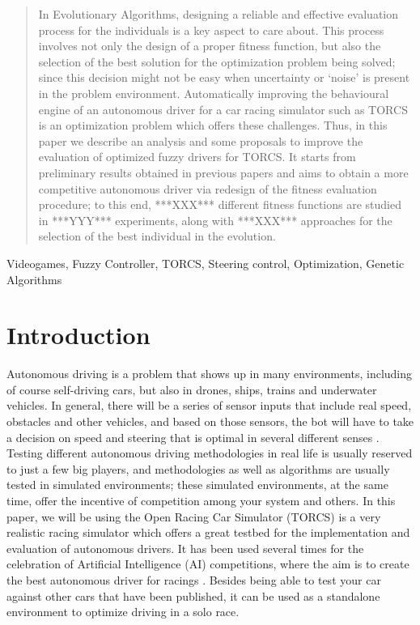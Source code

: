 \documentclass[conference]{IEEEtran}
\begin{document}
\begin{abstract}
	
In Evolutionary Algorithms, designing a reliable and effective
evaluation process for the individuals is a key aspect to care
about. This process involves not only the design of a proper fitness
function, but also the selection of the best solution for the
optimization problem being solved; since this decision might not be
easy when uncertainty or `noise' is present in the problem
environment. Automatically improving the behavioural engine of an
autonomous driver for a car racing simulator such as TORCS is an
optimization problem which offers these challenges. Thus, in this
paper we describe an analysis and some proposals to improve the
evaluation of optimized fuzzy drivers for TORCS. It starts from
preliminary results obtained in previous papers and aims to obtain a
more competitive autonomous driver via redesign of the fitness
evaluation procedure; to this end, ***XXX*** different fitness functions are
studied in ***YYY*** experiments, along with ***XXX***
approaches for the selection of the best individual in the evolution. 
\end{abstract}
\begin{IEEEkeywords}
Videogames, Fuzzy Controller, TORCS, Steering control, Optimization, Genetic Algorithms
\end{IEEEkeywords}
%
\section{Introduction}
\label{sec:intro}

Autonomous driving is a problem that shows up in many environments,
including of course self-driving cars, but also in drones, ships,
trains and underwater vehicles. In general, there will be a series of
sensor inputs that include real speed, obstacles and other vehicles,
and based on those sensors, the bot will have to take a decision on
speed and steering that is optimal in several different
senses \cite{Autodriv2006}. Testing different autonomous driving methodologies in real life is usually reserved to just a few big players, and methodologies
as well as algorithms are usually tested in simulated environments;
these simulated environments, at the same time, offer the incentive of
competition among your system and others. In this paper, we will be
using the Open Racing Car Simulator (TORCS) \cite{WebTORCS} is a very
realistic racing simulator which offers a great testbed for the
implementation and evaluation of autonomous drivers.  
It has been used several times for the celebration of Artificial
Intelligence (AI) competitions, where the aim is to create the best
autonomous driver for racings
\cite{torcs5,manualTORCS,Torcs3,torcs7,oponnents2010}. Besides being
able to test your car against other cars that have been published, it
can be used as a standalone environment to optimize driving in a
solo race. 
\end{document}
